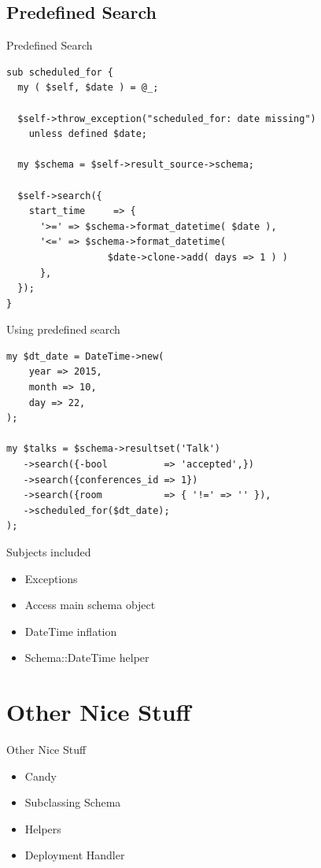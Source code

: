 \subsection{Predefined Search}
\begin{frame}[fragile]{Predefined Search}
\begin{lstlisting}
sub scheduled_for {
  my ( $self, $date ) = @_;

  $self->throw_exception("scheduled_for: date missing")
    unless defined $date;
    
  my $schema = $self->result_source->schema;

  $self->search({
    start_time     => {
      '>=' => $schema->format_datetime( $date ),
      '<=' => $schema->format_datetime( 
                  $date->clone->add( days => 1 ) )
      },
  });
}
\end{lstlisting}
\end{frame}


\begin{frame}[fragile]{Using predefined search}

\begin{lstlisting}
my $dt_date = DateTime->new(
    year => 2015,
    month => 10,
    day => 22,
);

my $talks = $schema->resultset('Talk')
   ->search({-bool          => 'accepted',})
   ->search({conferences_id => 1})
   ->search({room           => { '!=' => '' }),
   ->scheduled_for($dt_date);
);
\end{lstlisting}
\end{frame}

\begin{frame}[fragile]{Subjects included}
\begin{itemize}
\item Exceptions
\item Access main schema object
\item DateTime inflation
\item Schema::DateTime helper
\end{itemize}
\end{frame}

\section{Other Nice Stuff}

\begin{frame}{Other Nice Stuff}
\begin{itemize}
\item Candy
\item Subclassing Schema
\item Helpers
\item Deployment Handler
\end{itemize}
\end{frame}

